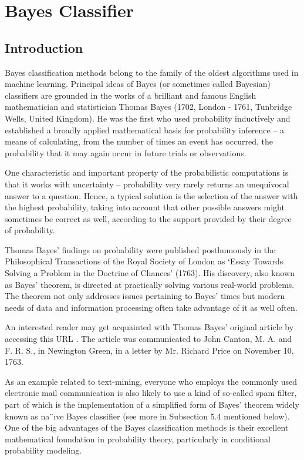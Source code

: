 \chapter{Bayes Classifier}

\section{Introduction}

Bayes classification methods belong to the family of the oldest algorithms used
in machine learning. Principal ideas of Bayes (or sometimes called Bayesian)
classifiers are grounded in the works of a brilliant and famous English mathematician and statistician Thomas Bayes (1702, London - 1761, Tunbridge Wells,
United Kingdom). He was the first who used probability inductively and established a broadly applied mathematical basis for probability inference – a means
of calculating, from the number of times an event has occurred, the probability
that it may again occur in future trials or observations.

One characteristic and important property of the probabilistic computations
is that it works with uncertainty – probability very rarely returns an unequivocal
answer to a question. Hence, a typical solution is the selection of the answer with
the highest probability, taking into account that other possible answers might
sometimes be correct as well, according to the support provided by their degree
of probability.

Thomas Bayes’ findings on probability were published posthumously in the
Philosophical Transactions of the Royal Society of London as ‘Essay Towards
Solving a Problem in the Doctrine of Chances’ (1763). His discovery, also known
as Bayes’ theorem, is directed at practically solving various real-world problems.
The theorem not only addresses issues pertaining to Bayes’ times but modern
needs of data and information processing often take advantage of it as well often.

An interested reader may get acquainted with Thomas Bayes’ original article by accessing this URL \cite{ref19}. The article was communicated to John Canton,
M. A. and F. R. S., in Newington Green, in a letter by Mr. Richard Price on
November 10, 1763.

As an example related to text-mining, everyone who employs the commonly
used electronic mail communication is also likely to use a kind of so-called spam
filter, part of which is the implementation of a simplified form of Bayes’ theorem
widely known as na¨ıve Bayes classifier (see more in Subsection 5.4 mentioned
below). One of the big advantages of the Bayes classification methods is their excellent mathematical foundation in probability theory, particularly in conditional
probability modeling.


